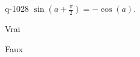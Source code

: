 \begin{truefalse}{q-1028}
$\sin(a+\frac{\pi}{2})=-\cos(a)$.
\item Vrai
\item* Faux
\end{truefalse}

